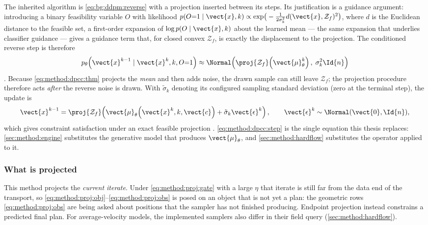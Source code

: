 The inherited algorithm is \eqref{eq:bg:ddpm:reverse} with a projection inserted between its
steps. Its justification is a guidance argument: introducing a binary feasibility variable
$O$ with likelihood
$p(O{=}1\mid\vect{x},k) \propto \exp\!\big(-\tfrac{1}{2\sigma_{k}^{2}}d(\vect{x},\mathcal{Z}_{f})^{2}\big)$,
where $d$ is the Euclidean distance to the feasible set, a first-order expansion of
$\log p(O\mid\vect{x},k)$ about the learned mean --- the same expansion that underlies classifier
guidance \parencite{dhariwal2021diffusion} --- gives a guidance term that, for closed convex
$\mathcal{Z}_{f}$, is exactly the displacement to the projection. The conditioned reverse step
is therefore
\begin{equation}\label{eq:method:dpcc:thm}
  p_{\theta}\!\left(\vect{x}^{k-1}\mid\vect{x}^{k},k,O{=}1\right)
  \approx \Normal\!\left(\proj{\mathcal{Z}_{f}}\!\left(\vect{\mu}_{\theta}^{k}\right),\;
    \sigma_{k}^{2}\Id{n}\right)
\end{equation}
\parencite[Theorem~1]{romer2025diffusion}. Because \eqref{eq:method:dpcc:thm} projects the
\emph{mean} and then adds noise, the drawn sample can still leave $\mathcal{Z}_{f}$; the
projection procedure therefore acts \emph{after} the reverse noise is drawn. With
$\tilde{\sigma}_k$ denoting its configured sampling standard deviation (zero at the terminal step),
the update is
\begin{equation}\label{eq:method:dpcc:step}
  \vect{x}^{k-1}
  = \proj{\mathcal{Z}_{f}}\!\left(
      \vect{\mu}_{\theta}\!\left(\vect{x}^{k},k,\vect{c}\right) + \tilde{\sigma}_{k}\vect{\epsilon}^{k}
    \right),
  \qquad \vect{\epsilon}^{k}\sim\Normal(\vect{0},\Id{n}),
\end{equation}
which gives constraint satisfaction under an exact feasible projection
\parencite[Eq.~16]{romer2025diffusion}. \eqref{eq:method:dpcc:step} is the single equation this
thesis replaces: \autoref{sec:method:engine} substitutes the generative model that produces
$\vect{\mu}_{\theta}$, and \autoref{sec:method:hardflow} substitutes the operator applied to it.

\subsubsection*{What is projected}

This method projects the \emph{current iterate}. Under \eqref{eq:method:proj:gate} with a large $\eta$
that iterate is still far from the data end of the transport, so
\eqref{eq:method:proj:obj}--\eqref{eq:method:proj:obs} is posed on an object that is not yet a
plan: the geometric rows \eqref{eq:method:proj:obs} are being asked about positions that the
sampler has not finished producing. Endpoint projection instead constrains a predicted final plan. For average-velocity models, the
implemented samplers also differ in their field query (\autoref{sec:method:hardflow}).

